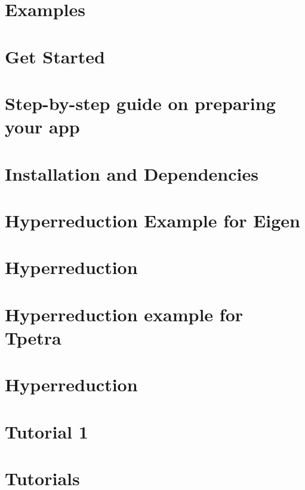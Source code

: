 \documentclass[twoside]{book}
\newcommand{\+}{\discretionary{\mbox{\scriptsize$\hookleftarrow$}}{}{}}
\newcommand{\clearemptydoublepage}{%
  \newpage{\pagestyle{empty}\cleardoublepage}%
}
\begin{document}
\chapter{Examples}
\label{autotoc_md13}

\chapter{Get Started}
\label{autotoc_md14}

\chapter{Step-\/by-\/step guide on preparing your app}
\label{autotoc_md15}

\chapter{Installation and Dependencies}
\label{autotoc_md16}

\chapter{Hyperreduction Example for Eigen}
\label{autotoc_md19}

\chapter{Hyperreduction}
\label{autotoc_md20}

\chapter{Hyperreduction example for Tpetra}
\label{autotoc_md21}

\chapter{Hyperreduction}
\label{autotoc_md22}

\chapter{Tutorial 1}
\label{autotoc_md24}

\chapter{Tutorials}
\label{autotoc_md25}


\backmatter
\newpage
{}
\clearemptydoublepage
{}
\printindex
\end{document}
